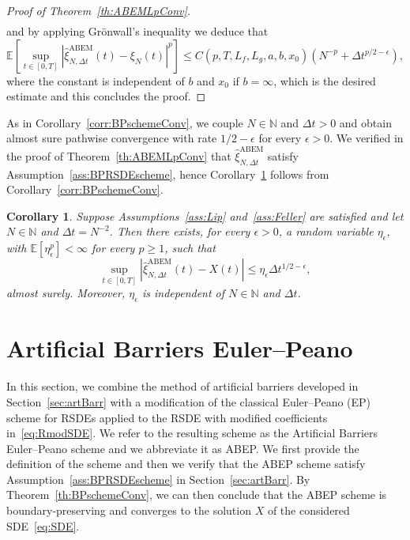\documentclass[11pt]{amsart}
\newtheorem{corollary}[theorem]{Corollary}
\newcommand{\E}{{\mathbb E}}
\newcommand{\ABEM}{\textrm{ABEM}}
\begin{document}
{\begin{proof}[Proof of Theorem~\ref{th:ABEMLpConv}]
\begin{align*}
\end{align*}
and by applying Grönwall's inequality we deduce that
\begin{equation*}
\E \left[ \sup_{t \in [0,T]} \left| \hat{\xi}_{N,\Delta t}^{\ABEM}(t) - \xi_{N}(t) \right|^{p} \right] \leq C(p,T,L_{f},L_{g},a,b,x_{0}) (N^{-p} + \Delta t^{p/2-\epsilon}),
\end{equation*}
where the constant is independent of $b$ and $x_{0}$ if $b=\infty$, which is the desired estimate and this concludes the proof.
\end{proof}

As in Corollary~\ref{corr:BPschemeConv}, we couple $N \in \mathbb{N}$ and $\Delta t>0$ and obtain almost sure pathwise convergence with rate $1/2-\epsilon$ for every $\epsilon>0$. We verified in the proof of Theorem~\ref{th:ABEMLpConv} that $\hat{\xi}^{\ABEM}_{N,\Delta t}$ satisfy Assumption~\ref{ass:BPRSDEscheme}, hence Corollary~\ref{corr:ABEMasConv} follows from Corollary~\ref{corr:BPschemeConv}.
\begin{corollary}\label{corr:ABEMasConv}
Suppose Assumptions~\ref{ass:Lip} and~\ref{ass:Feller} are satisfied and let $N \in \mathbb{N}$ and $\Delta t = N^{-2}$. Then there exists, for every $\epsilon>0$, a random variable $\eta_{\epsilon}$, with $\E \left[ \eta_{\epsilon}^{p} \right] < \infty$ for every $p \geq 1$, such that
\begin{equation*}
\sup_{t \in [0,T]} |\hat{\xi}^{\ABEM}_{N,\Delta t}(t) - X(t)| \leq \eta_{\epsilon} \Delta t^{1/2 - \epsilon},
\end{equation*}
almost surely. Moreover, $\eta_{\epsilon}$ is independent of $N \in \mathbb{N}$ and $\Delta t$.
\end{corollary}

\section{Artificial Barriers Euler--Peano}\label{sec:ABEP}
In this section, we combine the method of artificial barriers developed in Section~\ref{sec:artBarr} with a modification of the classical Euler--Peano (EP) scheme for RSDEs applied to the RSDE with modified coefficients in~\eqref{eq:RmodSDE}. We refer to the resulting scheme as the Artificial Barriers Euler--Peano scheme and we abbreviate it as ABEP. We first provide the definition of the scheme and then we verify that the ABEP scheme satisfy Assumption~\ref{ass:BPRSDEscheme} in Section~\ref{sec:artBarr}. By Theorem~\ref{th:BPschemeConv}, we can then conclude that the ABEP scheme is boundary-preserving and converges to the solution $X$ of the considered SDE~\eqref{eq:SDE}. 

}
\end{document}
